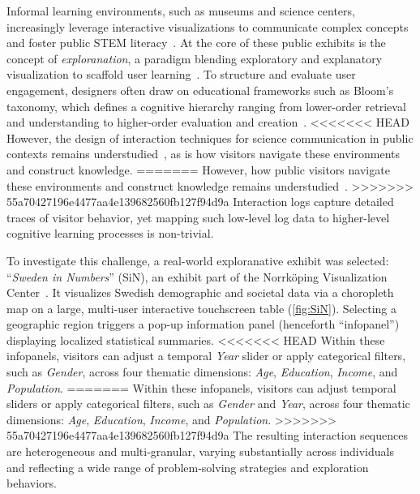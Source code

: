 Informal learning environments, such as museums and science centers, increasingly leverage interactive visualizations to communicate complex concepts and foster public STEM literacy~\cite{besancon2022exploring, borner2016investigating}.
At the core of these public exhibits is the concept of \textit{exploranation}, a paradigm blending exploratory and explanatory visualization to scaffold user learning~\cite{ynnerman2018exploranation, host2020nano}.
To structure and evaluate user engagement, designers often draw on educational frameworks such as Bloom's taxonomy, which defines a cognitive hierarchy ranging from lower-order retrieval and understanding to higher-order evaluation and creation~\cite{anderson2001taxonomy, bloom1956taxonomy}.
<<<<<<< HEAD
However, the design of interaction techniques for science communication in public contexts remains understudied~\cite{besancon2021state}, as is how visitors navigate these environments and construct knowledge.
=======
However, how public visitors navigate these environments and construct knowledge remains understudied~\cite{besancon2021state}.
>>>>>>> 55a70427196e4477aa4e139682560fb127f94d9a
Interaction logs capture detailed traces of visitor behavior, yet mapping such low-level log data to higher-level cognitive learning processes is non-trivial.

To investigate this challenge, a real-world exploranative exhibit was selected: ``\textit{Sweden in Numbers}'' (SiN), an exhibit part of the Norrk\"{o}ping Visualization Center~\cite{viscenter2026}.
It visualizes Swedish demographic and societal data via a choropleth map on a large, multi-user interactive touchscreen table (\cref{fig:SiN}).
Selecting a geographic region triggers a pop-up information panel (henceforth ``infopanel'') displaying localized statistical summaries.
<<<<<<< HEAD
Within these infopanels, visitors can adjust a temporal \textit{Year} slider or apply categorical filters, such as \textit{Gender}, across four thematic dimensions: \textit{Age}, \textit{Education}, \textit{Income}, and \textit{Population}.
=======
Within these infopanels, visitors can adjust temporal sliders or apply categorical filters, such as \textit{Gender} and \textit{Year}, across four thematic dimensions: \textit{Age}, \textit{Education}, \textit{Income}, and \textit{Population}.
>>>>>>> 55a70427196e4477aa4e139682560fb127f94d9a
The resulting interaction sequences are heterogeneous and multi-granular, varying substantially across individuals and reflecting a wide range of problem-solving strategies and exploration behaviors.

